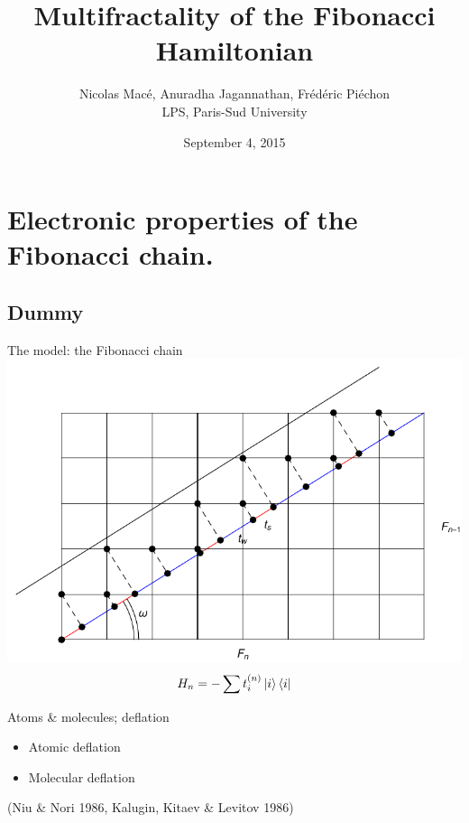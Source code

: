 \documentclass[xcolor=x11names,compress,professionalfonts]{beamer}
\renewcommand{\(}{\begin{columns}}
\renewcommand{\)}{\end{columns}}
\newcommand{\<}[1]{\begin{column}{#1}}
\renewcommand{\>}{\end{column}}
\newcommand{\ham}{\ensuremath{H}}
\begin{document}
\begin{frame}
\title{Multifractality of the Fibonacci Hamiltonian}
\author{ Nicolas Macé, Anuradha Jagannathan, Frédéric Piéchon \\ LPS, Paris-Sud University}
\date{
	September 4, 2015
}
\titlepage
\end{frame}

\section{Electronic properties of the Fibonacci chain.}
\subsection{Dummy}

\begin{frame}{The model: the Fibonacci chain}
	\centering
	\includegraphics[scale=.7]{cut_and_project.pdf}
	\[ \ham_n = - \sum t_i^{(n)} \ket{i} \bra{i} \]
\end{frame}

\begin{frame}{Atoms \& molecules; deflation}
	\centering
	\begin{itemize}
	\item Atomic deflation 
	\item Molecular deflation 
	\end{itemize}
	\begin{flushright}
	(Niu \& Nori 1986, Kalugin, Kitaev \& Levitov 1986)
	\end{flushright}
\end{frame}
\end{document}
